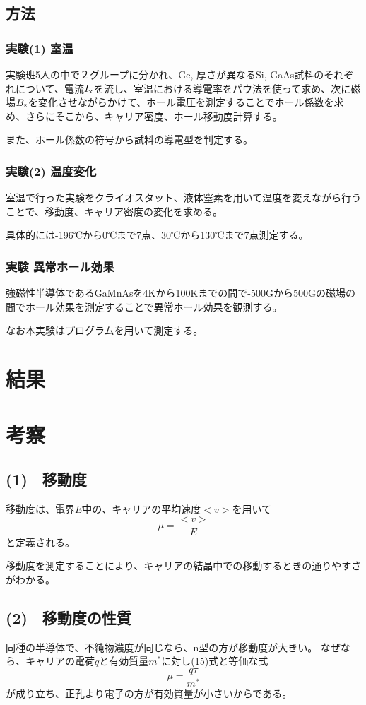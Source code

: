 \documentclass[dvipdfmx]{jsarticle}
\begin{document}
\subsection{方法}
\subsubsection{実験(1) 室温}
実験班5人の中で２グループに分かれ、Ge, 厚さが異なるSi, GaAs試料のそれぞれについて、電流$I_{\rm{x}}$を流し、室温における導電率をパウ法を使って求め、次に磁場$B_{\rm{z}}$を変化させながらかけて、ホール電圧を測定することでホール係数を求め、さらにそこから、キャリア密度、ホール移動度計算する。

また、ホール係数の符号から試料の導電型を判定する。


\subsubsection{実験(2) 温度変化}
室温で行った実験をクライオスタット、液体窒素を用いて温度を変えながら行うことで、移動度、キャリア密度の変化を求める。

具体的には-196℃から0℃まで7点、30℃から130℃まで7点測定する。


\subsubsection{実験 異常ホール効果}

強磁性半導体であるGaMnAsを4Kから100Kまでの間で-500Gから500Gの磁場の間でホール効果を測定することで異常ホール効果を観測する。

なお本実験はプログラムを用いて測定する。
\section{結果}

\section{考察}
\subsection*{(1)　移動度}
移動度は、電界$E$中の、キャリアの平均速度$<v>$を用いて
\begin{equation}
\mu = \frac{<v>}{E}
\end{equation}
と定義される。

移動度を測定することにより、キャリアの結晶中での移動するときの通りやすさがわかる。
\subsection*{(2)　移動度の性質}
同種の半導体で、不純物濃度が同じなら、n型の方が移動度が大きい。
なぜなら、キャリアの電荷$q$と有効質量$m^{\ast}$に対し(15)式と等価な式
\begin{equation}
\mu = \frac{q\tau}{m^{\ast}}
\end{equation}が成り立ち、正孔より電子の方が有効質量が小さいからである。
\end{document}
